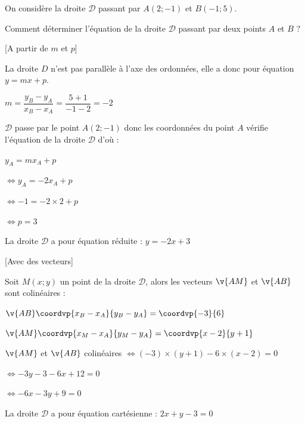 \begin{ex}{}{}
On considère la droite $\mathcal{D}$ passant par $A(2;-1)$ et $B(-1;5)$.

\noindent Comment déterminer l'équation de la droite $\mathcal{D}$ passant par deux points $A$ et $B$ ?

\noindent \begin{minipage}{8cm}
\begin{methode}{}{}[A partir de $m$ et $p$]

\medskip
La droite $D$ n'est pas parallèle à l'axe des ordonnées, elle a donc pour équation $y=mx+p$.

\medskip
\hspace{5mm}$m=\dfrac{y_B-y_A}{x_B-x_A}=\dfrac{5+1}{-1-2}=-2$

\medskip
\noindent $\mathcal{D}$ passe par le point $A(2;-1)$ donc les coordonnées du point $A$ vérifie l'équation de la droite $\mathcal{D}$ d'où :

\hspace{5mm}\phantom{$\Longleftrightarrow$} $y_A=mx_A+p$

\hspace{5mm}$\Longleftrightarrow y_A=-2x_A+p$

\hspace{5mm}$\Longleftrightarrow -1=-2\times2+p$

\hspace{5mm}$\Longleftrightarrow p=3$

\medskip
La droite $\mathcal{D}$ a pour équation réduite : $y=-2x+3$
\end{methode}
\end{minipage}
\hspace{5mm}
\noindent \begin{minipage}{8cm}
\begin{methode}{}{}[Avec des vecteurs]

\medskip
Soit $M(x;y)$ un point de la droite $\mathcal{D}$, alors les vecteurs $\v{AM}$ et $\v{AB}$ sont colinéaires :

\medskip
\hspace{5mm}$\v{AB}\coordvp{x_B-x_A}{y_B-y_A}=\coordvp{-3}{6}$

\hspace{5mm}$\v{AM}\coordvp{x_M-x_A}{y_M-y_A}=\coordvp{x-2}{y+1}$

\medskip
\noindent $\v{AM}$ et $\v{AB}$ colinéaires $\Longleftrightarrow (-3)\times(y+1)-6\times(x-2)=0$

\noindent {} $\Longleftrightarrow -3y-3-6x+12=0$

\noindent {} $\Longleftrightarrow -6x-3y+9=0$

\medskip
La droite $\mathcal{D}$ a pour équation cartésienne : $2x+y-3=0$
\end{methode}
\end{minipage}
\end{ex}

